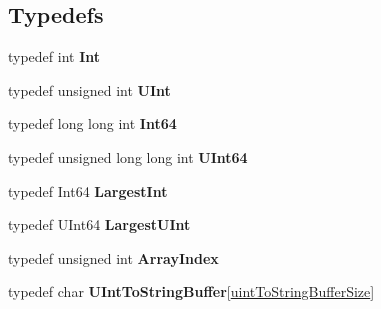 \subsection*{Typedefs}
\begin{DoxyCompactItemize}
\item 
typedef int {\bfseries Int}\hypertarget{namespace_json_a08122e8005b706d982e48cca1e2119c7}{}\label{namespace_json_a08122e8005b706d982e48cca1e2119c7}

\item 
typedef unsigned int {\bfseries U\+Int}\hypertarget{namespace_json_a800fb90eb6ee8d5d62b600c06f87f7d4}{}\label{namespace_json_a800fb90eb6ee8d5d62b600c06f87f7d4}

\item 
typedef long long int {\bfseries Int64}\hypertarget{namespace_json_ab7b47d2905da3b4ae60e4e800ec9ae5f}{}\label{namespace_json_ab7b47d2905da3b4ae60e4e800ec9ae5f}

\item 
typedef unsigned long long int {\bfseries U\+Int64}\hypertarget{namespace_json_a01f20bce8f8229f38ff890168c0e6452}{}\label{namespace_json_a01f20bce8f8229f38ff890168c0e6452}

\item 
typedef Int64 {\bfseries Largest\+Int}\hypertarget{namespace_json_a218d880af853ce786cd985e82571d297}{}\label{namespace_json_a218d880af853ce786cd985e82571d297}

\item 
typedef U\+Int64 {\bfseries Largest\+U\+Int}\hypertarget{namespace_json_ae202ecad69725e23443f465e257456d0}{}\label{namespace_json_ae202ecad69725e23443f465e257456d0}

\item 
typedef unsigned int {\bfseries Array\+Index}\hypertarget{namespace_json_a8048e741f2177c3b5d9ede4a5b8c53c2}{}\label{namespace_json_a8048e741f2177c3b5d9ede4a5b8c53c2}

\item 
typedef char {\bfseries U\+Int\+To\+String\+Buffer}\mbox{[}\hyperlink{namespace_json_a0c5f614b019f20b4598dcaec09d9e820ae4f2008c7919f20d81286121d1374424}{uint\+To\+String\+Buffer\+Size}\mbox{]}\hypertarget{namespace_json_a602bcf69c2042fb61c3b243cb16f04ca}{}\label{namespace_json_a602bcf69c2042fb61c3b243cb16f04ca}

\end{DoxyCompactItemize}
